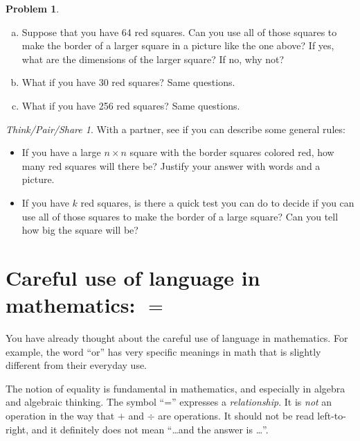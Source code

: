 \documentclass[12pt, reqno]{amsart}
\theoremstyle{remark}
\newtheorem*{thinkpair*}{Think/Pair/Share}
\theoremstyle{definition}
\newtheorem{problem}{Problem}
\numberwithin{equation}{section}  %
\begin{document}
\bigskip

\begin{problem}\ 
\begin{enumerate}[(a)]
\item
Suppose that you have 64 red squares.  Can you use all of those squares to make the border of a larger square in a picture like the one above?  If yes, what are the dimensions of the larger square?  If no, why not?\\
\item
What if you have 30 red squares?  Same questions.\\
\item
What if you have 256 red squares?  Same questions.\\
\end{enumerate}
\end{problem}

\bigskip


\begin{thinkpair*}
With a partner, see if you can describe some general rules:
\begin{itemize}
\item
If you have a large $n \times n$ square with the border squares colored red, how many red squares will there be?  Justify your answer with words and a picture.\\

\item
If you have $k$ red squares, is there a quick test you can do to decide if you can use all of those squares to make the border of a large square?  Can you tell how big the square will be?
\end{itemize}
\end{thinkpair*}

\newpage




\section{Careful use of language in mathematics: $=$}
You have already thought about the careful use of language in mathematics.  For example, the word ``or'' has very specific meanings in math that is slightly different from their everyday use.

The notion of equality is fundamental in mathematics, and especially in algebra and algebraic thinking.  The symbol ``='' expresses a \emph{relationship}.  It is \emph{not} an operation in the way that $+$ and $\div$ are operations.  It should not be read left-to-right, and it definitely does not mean ``\dots and the answer is \dots''.
\end{document}
